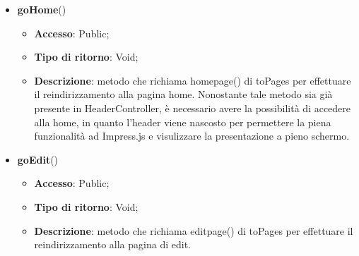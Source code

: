 {{\begin{itemize}
\begin{itemize}
				\item \textbf{Descrizione}: metodo che richiama una funzione JavaScript per la traduzione dell'oggetto json, ricavato tramite getPresentazione() di SharedData, in html eseguibile dal framework Impress.js.
			\end{itemize}
			\item \textbf{goHome}()
			\begin{itemize}
				\item \textbf{Accesso}: Public;
				\item \textbf{Tipo di ritorno}: Void;
				\item \textbf{Descrizione}: metodo che richiama homepage() di toPages per effettuare il reindirizzamento alla pagina home. Nonostante tale metodo sia già presente in HeaderController, è necessario avere la possibilità di accedere alla home, in quanto l'header viene nascosto per permettere la piena funzionalità ad Impress.js e visulizzare la presentazione a pieno schermo.
			\end{itemize}
			\item \textbf{goEdit}()
			\begin{itemize}
				\item \textbf{Accesso}: Public;
				\item \textbf{Tipo di ritorno}: Void;
				\item \textbf{Descrizione}: metodo che richiama editpage() di toPages per effettuare il reindirizzamento alla pagina di edit.
			\end{itemize}
		\end{itemize}
	}
}
